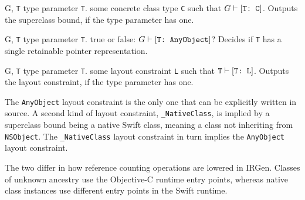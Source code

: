 \documentclass[../generics]{subfiles}
\begin{document}
\begin{itemize}
{G, \texttt{T}}
{type parameter \texttt{T}.}
{some concrete class type \texttt{C} such that $G\vdash[\texttt{T:~C}]$.}
{Outputs the superclass bound, if the type parameter has one.}

{G, \texttt{T}}
{type parameter \texttt{T}.}
{true or false: $G\vdash[\texttt{T:~AnyObject}]$?}
{Decides if \texttt{T} has a single retainable pointer representation.}

{G, \texttt{T}}
{type parameter \texttt{T}.}
{some layout constraint \texttt{L} such that $\texttt{T}\vdash[\texttt{T:~L}]$.}
{Outputs the layout constraint, if the type parameter has one.}

The \texttt{AnyObject} layout constraint is the only one that can be explicitly written in source. A second kind of layout constraint, \texttt{\_NativeClass}, is implied by a superclass bound being a native Swift class, meaning a class not inheriting from \texttt{NSObject}. The \texttt{\_NativeClass} layout constraint in turn implies the \texttt{AnyObject} layout constraint.

The two differ in how reference counting operations are lowered in IRGen. Classes of unknown ancestry use the Objective-C runtime entry points, whereas native class instances use different entry points in the Swift runtime.
\end{itemize}
\end{document}
